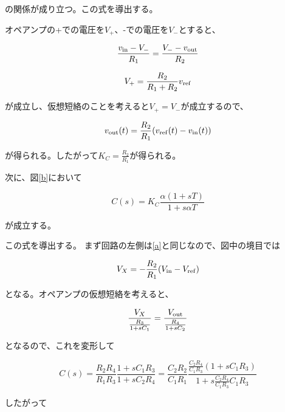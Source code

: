 \documentclass[uplatex, 11pt,a4j, titlepage]{jsarticle}
\begin{document}
の関係が成り立つ。この式を導出する。

オペアンプの+での電圧を$V_+$、-での電圧を$V_-$とすると、


\begin{equation}
    \frac{v_{\rm in} - V_-}{R_1} = \frac{V_- - v_{\rm out}}{R_2}
\end{equation}

\begin{equation}
    V_+ = \frac{R_2}{R_1+R_2}v_{\rm ref}
\end{equation}

が成立し、仮想短絡のことを考えると$V_+=V_-$が成立するので、

\begin{equation}\label{twenty_seven}
    v_{\rm out}(t) = \frac{R_2}{R_1}(v_{\rm ref}(t) - v_{\rm in}(t))
\end{equation}

が得られる。したがって$K_C = \frac{R_2}{R_1}$が得られる。

次に、図\ref{b}において

\begin{equation}\label{thirty}
    C(s)=K_C\frac{\alpha (1+sT)}{1+s\alpha T}
\end{equation}

が成立する。

この式を導出する。
まず回路の左側は\ref{a}と同じなので、図中の境目では

\begin{equation}
    V_X = - \frac{R_2}{R_1}(V_{\rm in} - V_{\rm ref})
\end{equation}

となる。オペアンプの仮想短絡を考えると、

\begin{equation}
    \frac{V_X}{\frac{R_3}{1+sC_1}} 
        = \frac{V_{\rm out}}{\frac{R_4}{1+sC_2}}
\end{equation}

となるので、これを変形して

\begin{equation}
    C(s) = \frac{R_2R_4}{R_1R_3}\frac{1+sC_1R_3}{1+sC_2R_4} 
    = \frac{C_2R_2}{C_1R_1} 
    \frac{\frac{C_2R_4}{C_1R_3}(1+sC_1R_3)}{1+s\frac{C_2R_4}{C_1R_3}C_1R_3}
\end{equation}

したがって
\end{document}
